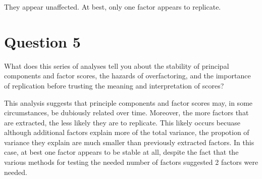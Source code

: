 \documentclass{article}\usepackage[]{graphicx}\usepackage[]{color}
\begin{document}
They appear unaffected. At best, only one factor appears to replicate. 

\section{Question 5}
What does this series of analyses tell you about the stability of principal components and factor scores, the hazards of overfactoring, and the importance of replication before trusting the meaning and interpretation of scores?

This analysis suggests that principle components and factor scores may, in some circumstances, be dubiously related over time. Moreover, the more factors that are extracted, the less likely they are to replicate. This likely occurs becuase although additional factors explain more of the total variance, the propotion of variance they explain are much smaller than previously extracted factors. In this case, at best one factor appears to be stable at all, despite the fact that the various methods for testing the needed number of factors suggested 2 factors were needed. 
\end{document}
